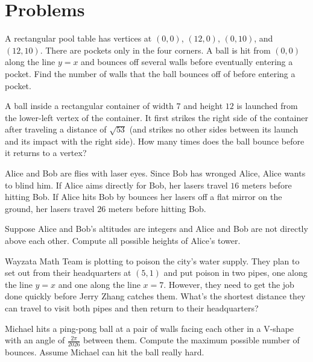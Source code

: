 \documentclass[11pt]{scrartcl}
\begin{document}
\section{Problems}

\begin{problem} %
    A rectangular pool table has vertices at $(0,0)$, $(12,0)$, $(0,10)$, and $(12,10)$. There are pockets only in the four corners. A ball is hit from $(0,0)$ along the line $y = x$ and bounces off several walls before eventually entering a pocket. Find the number of walls that the ball bounces off of before entering a pocket.
\end{problem}

\begin{problem} %
    A ball inside a rectangular container of width $7$ and height $12$ is launched from the lower-left vertex of the container. It first strikes the right side of the container after traveling a distance of $\sqrt{53}$ (and strikes no other sides between its launch and its impact with the right side). How many times does the ball bounce before it returns to a vertex?
\end{problem}

\begin{problem} %
    Alice and Bob are flies with laser eyes. Since Bob has wronged Alice, Alice wants to blind him. If Alice aims directly for Bob, her lasers travel $16$ meters before hitting Bob. If Alice hits Bob by bounces her lasers off a flat mirror on the ground, her lasers travel $26$ meters before hitting Bob.
    
    Suppose Alice and Bob's altitudes are integers and Alice and Bob are not directly above each other. Compute all possible heights of Alice's tower.
\end{problem}

\begin{problem} %
    Wayzata Math Team is plotting to poison the city's water supply. They plan to set out from their headquarters at $(5,1)$ and put poison in two pipes, one along the line $y = x$ and one along the line $x = 7$. However, they need to get the job done quickly before Jerry Zhang catches them. What's the shortest distance they can travel to visit both pipes and then return to their headquarters?
\end{problem}

\begin{problem}[Classical] %
    Michael hits a ping-pong ball at a pair of walls facing each other in a V-shape with an angle of $\frac{2\pi}{2026}$ between them. Compute the maximum possible number of bounces. Assume Michael can hit the ball really hard.
\end{problem}
\end{document}
